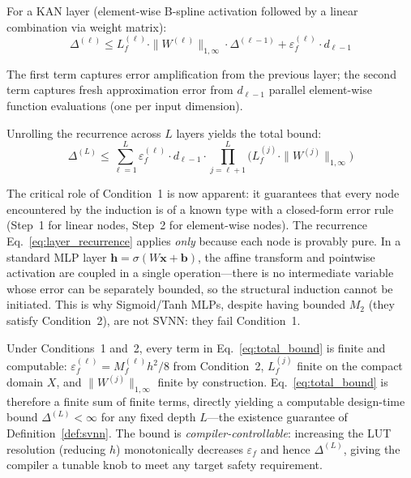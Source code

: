 For a KAN layer (element-wise B-spline activation followed by a linear
combination via weight matrix):
\begin{equation}
\Delta^{(\ell)} \leq L_f^{(\ell)} \cdot \|W^{(\ell)}\|_{1,\infty}
\cdot \Delta^{(\ell-1)} + \varepsilon_f^{(\ell)} \cdot d_{\ell-1}
\label{eq:layer_recurrence}
\end{equation}

The first term captures error amplification from the previous layer; the
second term captures fresh approximation error from $d_{\ell-1}$ parallel
element-wise function evaluations (one per input dimension).

Unrolling the recurrence across $L$ layers yields the total bound:
\begin{equation}
\Delta^{(L)} \leq \sum_{\ell=1}^{L} \varepsilon_f^{(\ell)} \cdot
d_{\ell-1} \cdot \prod_{j=\ell+1}^{L}
\bigl(L_f^{(j)} \cdot \|W^{(j)}\|_{1,\infty}\bigr)
\label{eq:total_bound}
\end{equation}

The critical role of Condition~1 is now apparent: it guarantees that every
node encountered by the induction is of a known type with a closed-form error
rule (Step~1 for linear nodes, Step~2 for element-wise nodes). The recurrence
Eq.~\ref{eq:layer_recurrence} applies \emph{only} because each node is
provably pure. In a standard MLP layer $\mathbf{h} = \sigma(W\mathbf{x} +
\mathbf{b})$, the affine transform and pointwise activation are coupled in a
single operation---there is no intermediate variable whose error can be
separately bounded, so the structural induction cannot be initiated. This is
why Sigmoid/Tanh MLPs, despite having bounded $M_2$ (they satisfy
Condition~2), are not SVNN: they fail Condition~1.

Under Conditions~1 and~2, every term in Eq.~\ref{eq:total_bound} is finite
and computable: $\varepsilon_f^{(\ell)} = M_f^{(\ell)} h^2/8$ from
Condition~2, $L_f^{(j)}$ finite on the compact domain $X$, and
$\|W^{(j)}\|_{1,\infty}$ finite by construction. Eq.~\ref{eq:total_bound}
is therefore a finite sum of finite terms, directly yielding a computable
design-time bound $\Delta^{(L)} < \infty$ for any fixed depth $L$---the
existence guarantee of Definition~\ref{def:svnn}. The bound is
\emph{compiler-controllable}: increasing the LUT resolution (reducing $h$)
monotonically decreases $\varepsilon_f$ and hence $\Delta^{(L)}$, giving the
compiler a tunable knob to meet any target safety requirement.

